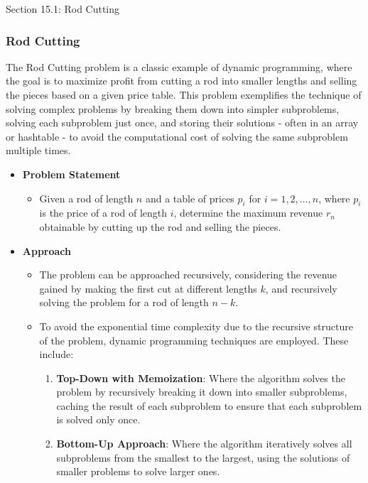 \begin{notes}{Section 15.1: Rod Cutting}
    \subsubsection*{Rod Cutting}

    The Rod Cutting problem is a classic example of dynamic programming, where the goal is to maximize profit from cutting a rod into smaller lengths and selling the pieces based on a given price table. 
    This problem exemplifies the technique of solving complex problems by breaking them down into simpler subproblems, solving each subproblem just once, and storing their solutions - often in an array 
    or hashtable - to avoid the computational cost of solving the same subproblem multiple times.
    
    \begin{itemize}
        \item \textbf{Problem Statement}
        \begin{itemize}
            \item Given a rod of length $n$ and a table of prices $p_i$ for $i = 1, 2, ..., n$, where $p_i$ is the price of a rod of length $i$, determine the maximum revenue $r_n$ obtainable by cutting 
            up the rod and selling the pieces.
        \end{itemize}
        
        \item \textbf{Approach}
        \begin{itemize}
            \item The problem can be approached recursively, considering the revenue gained by making the first cut at different lengths $k$, and recursively solving the problem for a rod of length $n-k$.
            \item To avoid the exponential time complexity due to the recursive structure of the problem, dynamic programming techniques are employed. These include:
                \begin{enumerate}
                    \item \textbf{Top-Down with Memoization}: Where the algorithm solves the problem by recursively breaking it down into smaller subproblems, caching the result of each subproblem to 
                    ensure that each subproblem is solved only once.
                    \item \textbf{Bottom-Up Approach}: Where the algorithm iteratively solves all subproblems from the smallest to the largest, using the solutions of smaller problems to solve larger ones.
                \end{enumerate}
        \end{itemize}
        

\end{itemize}
\end{notes}
